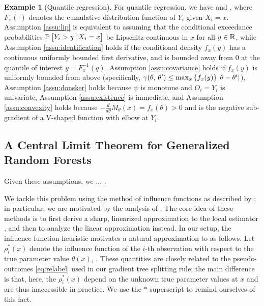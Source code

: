 \documentclass[aos]{imsart}
\theoremstyle{plain}
\theoremstyle{definition}
\newtheorem{exam}{Example}
\theoremstyle{remark}
\begin{document}
\begin{CJK}{UTF8}{gbsn}
\begin{exam}[Quantile regression]
For quantile regression, we have
and ,
where $F_x(\cdot)$ denotes the cumulative distribution function of $Y_i$ given $X_i = x$.
Assumption \ref{assu:lip} is equivalent to assuming that the
conditional exceedance probabilities $\mathbb{P}_{}\left[Y_i > y \,\big|\, X_i = x\right]$
be Lipschitz-continuous in $x$ for all $y \in \mathbb{R}$, while Assumption \ref{assu:identification}
holds if the conditional density $f_x(y)$ has a continuous uniformly bounded first derivative,
and is bounded away from 0 at the quantile of interest $y = F^{-1}_x(q)$.
Assumption \ref{assu:covariance} holds if $f_x(y)$ is uniformly bounded from above
(specifically, $\gamma(\theta, \, \theta') \leq \max_x \left\{f_x(y)\right\} \left\lvert\theta - \theta'\right\rvert$),
Assumption \ref{assu:donsker} holds because $\psi$ is monotone and $O_i = Y_i$ is univariate,
Assumption \ref{assu:existence} is immediate, and Assumption \ref{assu:convexity} holds
because $ - \frac{d}{d\theta} M_\theta(x) = f_x(\theta) > 0$ and 
is the negative sub-gradient of a V-shaped function with elbow at $Y_i$.
\end{exam}

\subsection{A Central Limit Theorem for Generalized Random Forests}
\label{sec:gauss}

Given these assumptions, we ... .

We tackle this problem using the method of influence functions as described by \citet{hampel1974influence};
in particular, we are motivated by the analysis of \citet{newey1994kernel}. The core idea of these methods
is to first derive a sharp, linearized approximation to the local estimator , and
then to analyze the linear approximation instead.
In our setup, the influence function heuristic motivates a natural approximation 
to  as follows. Let $\rho_i^*(x)$ denote the influence function of the
$i$-th observation with respect to the true parameter value $\theta(x)$,
.
These quantities are closely related to the pseudo-outcomes \eqref{eq:relabel} used in our gradient tree
splitting rule; the main difference is that, here, the $\rho_i^*(x)$ depend on the unknown true
parameter values at $x$ and are thus inaccessible in practice. We use the $*$-superscript to remind ourselves
of this fact.


\end{CJK}
\end{document}
